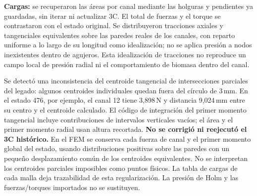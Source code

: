 \textbf{Cargas:} se recuperaron las áreas por canal mediante las holguras
y pendientes ya guardadas, sin iterar ni actualizar 3C. El total de fuerzas
y el torque se contrastaron con el estado original. Se distribuyeron
tracciones axiales y tangenciales equivalentes sobre las paredes reales
de los canales, con reparto uniforme a lo largo de su longitud como
idealización; no se aplica presión a nodos inexistentes dentro de agujeros.
Esta idealización de tracciones no reproduce un campo local de presión
radial ni el comportamiento de biomasa dentro del canal.

Se detectó una inconsistencia del centroide tangencial de intersecciones
parciales del legado: algunos centroides individuales quedan fuera del
círculo de 3\,mm. En el estado 476, por ejemplo, el canal 12 tiene 3,898\,N y
distancia 9,024\,mm entre su centro y el centroide calculado. El código de
integración del primer momento tangencial incluye contribuciones de
intervalos verticales vacíos; el área y el primer momento radial usan
altura recortada. \textbf{No se corrigió ni reejecutó el 3C histórico.}
En el FEM se conserva cada fuerza de canal y el primer momento global
del estado, usando distribuciones positivas sobre las paredes con un
pequeño desplazamiento común de los centroides equivalentes. No se
interpretan los centroides parciales imposibles como puntos físicos.
La tabla de cargas de cada malla deja trazabilidad de esta regularización.
La presión de Holm y las fuerzas/torques importados no se sustituyen.

